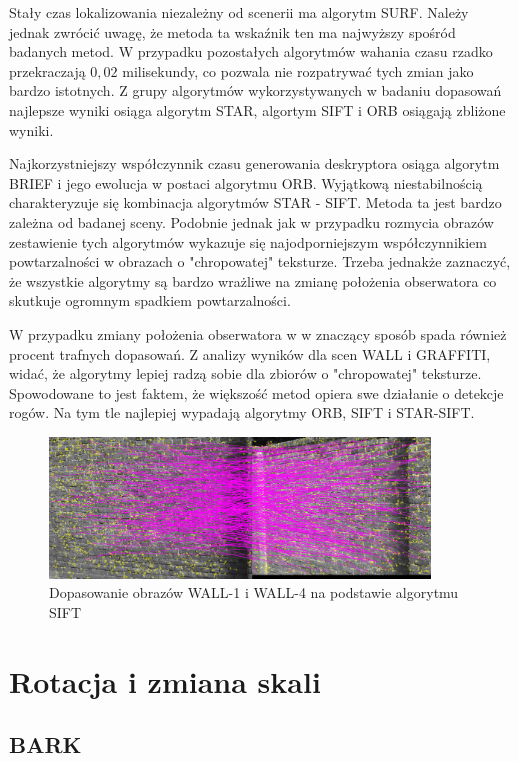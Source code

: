 Stały czas lokalizowania niezależny od scenerii ma algorytm SURF. Należy jednak zwrócić uwagę, że metoda ta wskaźnik ten ma najwyższy spośród badanych metod. W przypadku pozostałych algorytmów wahania czasu rzadko przekraczają $0,02$  milisekundy, co pozwala nie rozpatrywać tych zmian jako bardzo istotnych. Z grupy algorytmów wykorzystywanych w badaniu dopasowań najlepsze wyniki osiąga algorytm STAR, algortym SIFT i ORB osiągają zbliżone wyniki.

Najkorzystniejszy współczynnik czasu generowania deskryptora osiąga algorytm BRIEF i jego ewolucja w postaci algorytmu ORB. Wyjątkową niestabilnością charakteryzuje się kombinacja algorytmów STAR - SIFT. Metoda ta jest bardzo zależna od badanej sceny. Podobnie jednak jak w przypadku rozmycia obrazów zestawienie tych algorytmów wykazuje się najodporniejszym współczynnikiem powtarzalności w obrazach o "chropowatej" teksturze. Trzeba jednakże zaznaczyć, że wszystkie algorytmy są bardzo wrażliwe na zmianę położenia obserwatora co skutkuje ogromnym spadkiem powtarzalności.

W przypadku zmiany położenia obserwatora w w znaczący sposób spada również procent trafnych dopasowań. Z analizy wyników dla scen WALL i GRAFFITI, widać, że algorytmy lepiej radzą sobie dla zbiorów o "chropowatej" teksturze. Spowodowane to jest faktem, że większość metod opiera swe działanie o detekcje rogów. Na tym tle najlepiej wypadają algorytmy ORB, SIFT i STAR-SIFT.


\begin{figure}
\centering
\includegraphics[width=0.9\textwidth]{pict/badania/wall_sift_1_4.png}
\caption{Dopasowanie obrazów WALL-1 i WALL-4 na podstawie algorytmu SIFT}
\end{figure}




\FloatBarrier

\section{Rotacja i zmiana skali}
\FloatBarrier
\subsection{BARK}

